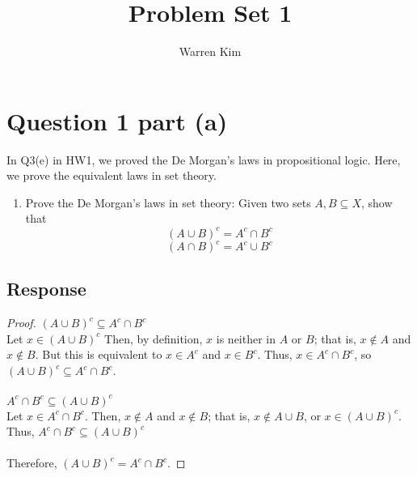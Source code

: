 \documentclass[13pt]{article}
\title{Problem Set 1}
\author{Warren Kim}
\begin{document}
\maketitle

\newpage
\section*{Question 1 part (a)}
In Q3(e) in HW1, we proved the De Morgan’s laws in propositional logic. Here, we prove
the equivalent laws in set theory.
\begin{enumerate}[label=(\alph*)]
\item Prove the De Morgan’s laws in set theory: Given two sets $A, B \subseteq X$, show that
  \[(A \cup B)^c = A^c \cap B^c\]
  \[(A \cap B)^c = A^c \cup B^c\]
\end{enumerate}

\subsection*{Response}
\begin{proof}
  $(A \cup B)^c \subseteq A^c \cap B^c$ \\
  Let $x \in (A \cup B)^c$ Then, by definition, $x$ is neither in $A$ or $B$; that is, $x \not\in A$
  and $x \not\in B$. But this is equivalent to $x \in A^c$ and $x \in B^c$. Thus, $x \in A^c \cap
  B^c$, so $(A \cup B)^c \subseteq A^c \cap B^c$. \\ \\
  $A^c \cap B^c \subseteq (A \cup B)^c$ \\
  Let $x \in A^c \cap B^c$. Then, $x \not\in A$ and $x \not\in B$; that is, $x \not\in A \cup B$,
  or $x \in (A \cup B)^c$. Thus, $A^c \cap B^c \subseteq (A \cup B)^c$ \\ \\
  Therefore, $(A \cup B)^c = A^c \cap B^c$.
\end{proof}





\newpage
\end{document}

